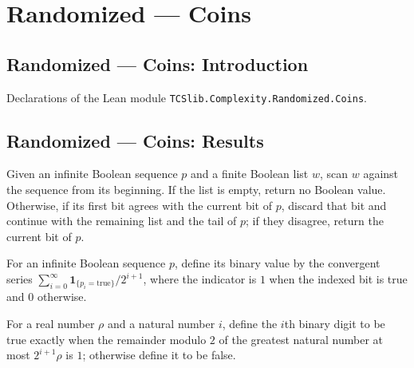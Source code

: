 \section{Randomized --- Coins}
\subsection*{Randomized --- Coins: Introduction}

Declarations of the Lean module \texttt{TCSlib.Complexity.Randomized.Coins}.

\subsection*{Randomized --- Coins: Results}

\begin{definition}
\label{Randomized.rhoCoinRun}
\leanok
Given an infinite Boolean sequence $p$ and a finite Boolean list $w$, scan $w$ against
the sequence from its beginning. If the list is empty, return no Boolean value.
Otherwise, if its first bit agrees with the current bit of $p$, discard that bit and
continue with the remaining list and the tail of $p$; if they disagree, return the
current bit of $p$.
\end{definition}

\begin{definition}
\label{Randomized.binVal}
\leanok
For an infinite Boolean sequence $p$, define its binary value by the convergent series
$\sum_{i=0}^{\infty} \mathbf{1}_{\{p_i=\mathrm{true}\}}/2^{i+1}$, where the indicator is
$1$ when the indexed bit is true and $0$ otherwise.
\end{definition}

\begin{definition}
\label{Randomized.binDigit}
\leanok
For a real number $\rho$ and a natural number $i$, define the $i$th binary digit to be
true exactly when the remainder modulo $2$ of the greatest natural number at most
$2^{i+1}\rho$ is $1$; otherwise define it to be false.
\end{definition}

